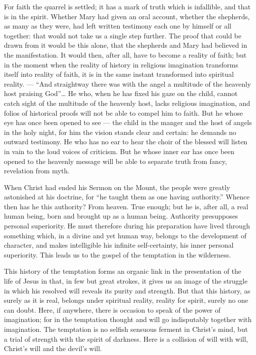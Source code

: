 \documentclass[12pt,a4paper,openany]{book}
\newcommand{\opage}[1]{\marginnote{\footnotesize\textit{[#1]}}}
\begin{document}
For faith the quarrel is settled; it has a mark of truth which is infallible, and that is in the spirit. Whether
Mary had given an oral account, whether the shepherds,
as many as they were, had left written testimony each one by himself
or all together: that would
not take us a single step further. The proof that
could be drawn from it would be this alone, that the shepherds and Mary had believed in the manifestation. It would
then, after all, have to become a reality of faith; but in the moment when the reality of
history in religious imagination transforms itself into
reality of faith, it is in the same instant transformed into
spiritual reality. --- ``And straightway there was with the angel
a multitude of the heavenly host praising God''\dots{}
He who, when he has fixed his gaze on the child,
cannot catch sight of the multitude of the heavenly host,
lacks religious imagination, and folios
of historical proofs will not be able to compel him
to faith. But he whose eye has once been opened
to see --- the child in the manger and the host of angels in the
holy night, for him the vision stands clear and certain: he
\setcounter{footnote}{0}%
\opage{62}demands no outward testimony. He who has no
ear to hear the choir of the blessed will listen in vain
to the loud voices of criticism. But he whose inner
ear has once been opened to the heavenly message
will be able to separate truth from fancy,
revelation from myth.

When Christ had ended his Sermon on the Mount, the
people were greatly astonished at his doctrine, for ``he
taught them as one having authority.'' Whence
then has he this authority? From heaven. True
enough; but he is, after all, a real human being, born and
brought up as a human being. Authority presupposes personal
superiority. He must therefore during his preparation
have lived through something which, in a divine
and yet human way, belongs to the development of character,
and makes intelligible his infinite self-certainty, his inner personal
superiority. This leads us to
the gospel of the temptation in the wilderness.

This history of the temptation forms an organic link in
the presentation of the life of Jesus in that, in few but
great strokes, it gives us an image of the struggle in which
his resolved will reveals its purity and
strength. But that this history, as surely as it is
real, belongs under spiritual reality, reality
for spirit, surely no one can doubt. Here, if
anywhere, there is occasion to speak of the power of
imagination; for in the temptation thought and will go
indisputably together with imagination. The temptation is
no selfish sensuous ferment in Christ's mind, but a
trial of strength with the spirit of darkness. Here is a collision
of will with will, Christ's will and the devil's
will.
\end{document}
